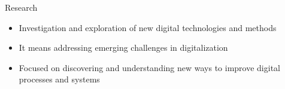 \documentclass{beamer}
\begin{document}
\begin{frame}
\begin{columns}
\begin{column}{0.45\textwidth}
\begin{exampleblock}{Research}
                    \scriptsize
                    \begin{itemize}
                        \item Investigation and exploration of new digital technologies and methods
                        \item It means addressing emerging challenges in digitalization
                        \item Focused on discovering and understanding new ways to improve digital processes and systems
                    \end{itemize}
                \end{exampleblock}
            \end{column}
        \end{columns}
    \end{frame}
\end{document}
